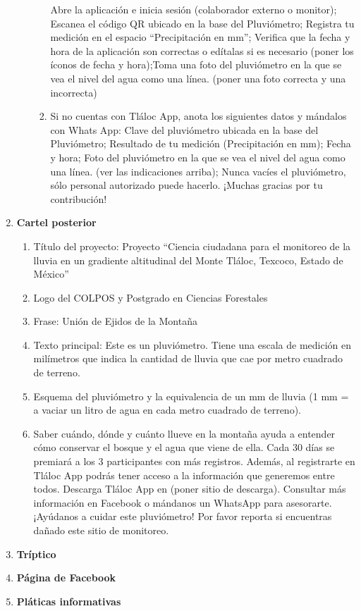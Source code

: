 \begin{enumerate}
\begin{enumerate}
\begin{enumerate}
            Abre la aplicación e inicia sesión (colaborador externo o monitor); Escanea el código QR ubicado en la base del Pluviómetro; Registra tu medición en el espacio “Precipitación en mm”; Verifica que la fecha  y hora de la aplicación son correctas o edítalas si es necesario (poner los íconos de fecha y hora);Toma una foto del pluviómetro en la que se vea el nivel del agua como una línea. (poner una foto correcta y una incorrecta)            
            \item 	Si no cuentas con Tláloc App, anota los siguientes datos y mándalos con Whats App: Clave del pluviómetro ubicada en la base del Pluviómetro; Resultado de tu medición (Precipitación en mm); Fecha y hora; Foto del pluviómetro en la que se vea el nivel del agua como una línea. (ver las indicaciones arriba); Nunca vacíes el pluviómetro, sólo personal autorizado puede hacerlo. ¡Muchas gracias por tu contribución!            
        \end{enumerate}
    \end{enumerate}
    \item \textbf{Cartel posterior} \begin{enumerate}
        \item Título del proyecto: Proyecto “Ciencia ciudadana para el monitoreo de la lluvia en un gradiente altitudinal del Monte Tláloc, Texcoco, Estado de México”
        \item Logo del COLPOS y Postgrado en Ciencias Forestales
        \item Frase: Unión de Ejidos de la Montaña
        \item Texto principal: Este es un pluviómetro. Tiene una escala de medición en milímetros que indica la cantidad de lluvia que cae por metro cuadrado de terreno.
        \item Esquema del pluviómetro y la equivalencia de un mm de lluvia (1 mm = a vaciar un litro de agua en cada metro cuadrado de terreno).
        \item Saber cuándo, dónde y cuánto llueve en la montaña ayuda a entender cómo conservar el bosque y el agua que viene de ella. Cada 30 días se premiará a los 3 participantes con más registros. Además, al registrarte en Tláloc App podrás tener acceso a la información que generemos entre todos. Descarga Tláloc App en (poner sitio de descarga). Consultar más información en Facebook o mándanos un WhatsApp para asesorarte. ¡Ayúdanos a cuidar este pluviómetro! Por favor reporta si encuentras dañado este sitio de monitoreo.
    \end{enumerate}
    \item \textbf{Tríptico}
    \item \textbf{Página de Facebook}
    \item \textbf{Pláticas informativas}
\end{enumerate}
